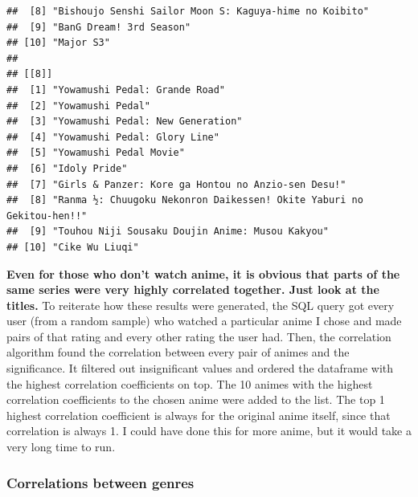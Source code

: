 \documentclass[
]{article}
\begin{document}
\begin{verbatim}
##  [8] "Bishoujo Senshi Sailor Moon S: Kaguya-hime no Koibito"         
##  [9] "BanG Dream! 3rd Season"                                        
## [10] "Major S3"                                                      
## 
## [[8]]
##  [1] "Yowamushi Pedal: Grande Road"                                       
##  [2] "Yowamushi Pedal"                                                    
##  [3] "Yowamushi Pedal: New Generation"                                    
##  [4] "Yowamushi Pedal: Glory Line"                                        
##  [5] "Yowamushi Pedal Movie"                                              
##  [6] "Idoly Pride"                                                        
##  [7] "Girls & Panzer: Kore ga Hontou no Anzio-sen Desu!"                  
##  [8] "Ranma ½: Chuugoku Nekonron Daikessen! Okite Yaburi no Gekitou-hen!!"
##  [9] "Touhou Niji Sousaku Doujin Anime: Musou Kakyou"                     
## [10] "Cike Wu Liuqi"
\end{verbatim}

\textbf{Even for those who don't watch anime, it is obvious that parts
of the same series were very highly correlated together. Just look at
the titles.} To reiterate how these results were generated, the SQL
query got every user (from a random sample) who watched a particular
anime I chose and made pairs of that rating and every other rating the
user had. Then, the correlation algorithm found the correlation between
every pair of animes and the significance. It filtered out insignificant
values and ordered the dataframe with the highest correlation
coefficients on top. The 10 animes with the highest correlation
coefficients to the chosen anime were added to the list. The top 1
highest correlation coefficient is always for the original anime itself,
since that correlation is always 1. I could have done this for more
anime, but it would take a very long time to run.

\hypertarget{correlations-between-genres}{%
\subsubsection{Correlations between
genres}\label{correlations-between-genres}}
\end{document}
